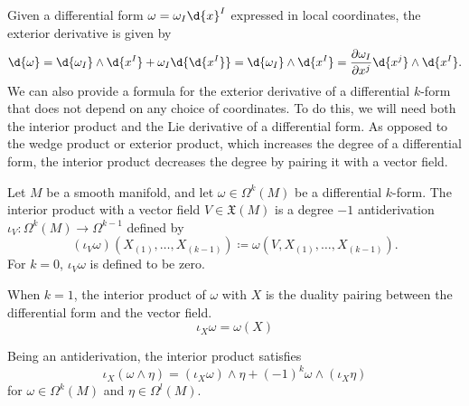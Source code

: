 \documentclass[a4paper,12pt]{article}
\begin{document}
Given a differential form $\omega = \omega_I \d{x}^I$ expressed in local coordinates, the exterior derivative is given by
\begin{equation}
    \d{\omega} = \d{\omega_I} \wedge \d{x^I} + \omega_I \d{\d{x^I}} = \d{\omega_I} \wedge \d{x^I} = \frac{\partial \omega_I}{\partial x^j} \d{x^j} \wedge \d{x^I}.
\end{equation}
We can also provide a formula for the exterior derivative of a differential $k$-form that does not depend on any choice of coordinates.
To do this, we will need both the interior product and the Lie derivative of a differential form.
As opposed to the wedge product or exterior product, which increases the degree of a differential form, the interior product decreases the degree by pairing it with a vector field.
\begin{definition}\label{def:interior_product}
    Let $M$ be a smooth manifold, and let $\omega \in \Omega^k(M)$ be a differential $k$-form.
    The interior product with a vector field $V \in \mathfrak{X}(M)$ is a degree $-1$ antiderivation $\iota_V \colon \Omega^k(M) \to \Omega^{k-1}$ defined by
    \begin{equation}
        (\iota_V \omega)(X_{(1)}, \ldots, X_{(k-1)}) \coloneq \omega(V, X_{(1)}, \ldots, X_{(k-1)}).
    \end{equation}
    For $k = 0$, $\iota_V \omega$ is defined to be zero.
\end{definition}
\begin{remark}
    When $k = 1$, the interior product of $\omega$ with $X$ is the duality pairing between the differential form and the vector field.
    \begin{equation}
        \iota_X \omega = \omega(X)
    \end{equation}
\end{remark}
Being an antiderivation, the interior product satisfies
\begin{equation}
    \iota_X (\omega \wedge \eta) = (\iota_X \omega) \wedge \eta + (-1)^k \omega \wedge (\iota_X \eta)
\end{equation}
for $\omega \in \Omega^k(M)$ and $\eta \in \Omega^l(M)$.
\end{document}
